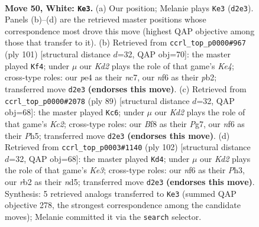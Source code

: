 \documentclass[11pt]{article}
\begin{document}
\clearpage

\begin{figure}[p]\centering
\begin{subfigure}{0.46\textwidth}\centering
\resizebox{\linewidth}{!}{%
\newchessgame
\chessboard[
  setfen={5B2/5p1k/5n2/8/p3p2p/P6P/1r1K1PR1/8 w - - 0 50},
  showmover=false,
  pgfstyle=straightmove, color=movearrow, markmove={d2-e3}
]}
\caption{}
\end{subfigure}\hfill
\begin{subfigure}{0.46\textwidth}\centering
\resizebox{\linewidth}{!}{%
\newchessgame
\chessboard[
  setfen={1r6/2N1K2p/p6P/P3kb2/8/1p2R3/1P4P1/8 b - - 13 51},
  showmover=false,
  pgfstyle=straightmove, color=movearrow, markmove={e5-f4}
]}
\caption{}
\end{subfigure}
\\[4pt]
\begin{subfigure}{0.46\textwidth}\centering
\resizebox{\linewidth}{!}{%
\newchessgame
\chessboard[
  setfen={8/2k1R1p1/8/2Pp1K1p/1p1P4/5P2/1P6/6r1 b - - 10 45},
  showmover=false,
  pgfstyle=straightmove, color=movearrow, markmove={c7-c6}
]}
\caption{}
\end{subfigure}\hfill
\begin{subfigure}{0.46\textwidth}\centering
\resizebox{\linewidth}{!}{%
\newchessgame
\chessboard[
  setfen={3k4/8/4pp1p/pBPn4/P5P1/4K2P/8/8 w - - 1 52},
  showmover=false,
  pgfstyle=straightmove, color=movearrow, markmove={e3-d4}
]}
\caption{}
\end{subfigure}
\caption{\textbf{Move 50, White: \texttt{Ke3}.} (a) Our position; Melanie plays \texttt{Ke3} (\texttt{d2e3}). Panels (b)--(d) are the retrieved master positions whose correspondence most drove this move (highest QAP objective among those that transfer to it). (b) Retrieved from \texttt{ccrl\_top\_p0000\#967} (ply 101) [structural distance $d$=32, QAP obj=70]: the master played \texttt{Kf4}; under $\mu$ our \emph{Kd2} plays the role of that game's \emph{Ke4}; cross-type roles: our \emph{p}e4 as their \emph{n}c7, our \emph{n}f6 as their \emph{p}b2; transferred move \texttt{d2e3} \textbf{(endorses this move)}. (c) Retrieved from \texttt{ccrl\_top\_p0000\#2078} (ply 89) [structural distance $d$=32, QAP obj=68]: the master played \texttt{Kc6}; under $\mu$ our \emph{Kd2} plays the role of that game's \emph{Kc2}; cross-type roles: our \emph{B}f8 as their \emph{P}g7, our \emph{n}f6 as their \emph{P}h5; transferred move \texttt{d2e3} \textbf{(endorses this move)}. (d) Retrieved from \texttt{ccrl\_top\_p0003\#1140} (ply 102) [structural distance $d$=32, QAP obj=68]: the master played \texttt{Kd4}; under $\mu$ our \emph{Kd2} plays the role of that game's \emph{Ke3}; cross-type roles: our \emph{n}f6 as their \emph{P}h3, our \emph{r}b2 as their \emph{n}d5; transferred move \texttt{d2e3} \textbf{(endorses this move)}. Synthesis: 5 retrieved analogs transferred to \texttt{Ke3} (summed QAP objective 278, the strongest correspondence among the candidate moves); Melanie committed it via the \texttt{search} selector.}
\label{fig:thought-m98}
\end{figure}
\end{document}
